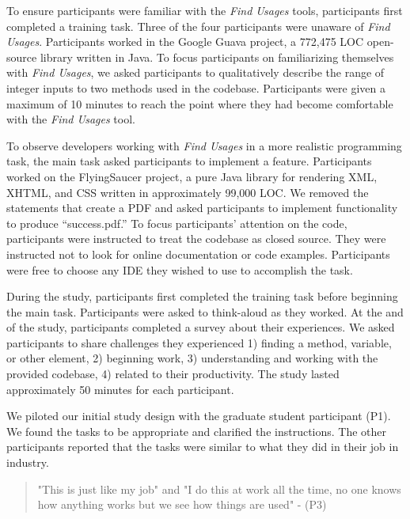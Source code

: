 \documentclass[conference]{IEEEtran}
\begin{document}

To ensure participants were familiar with the \textit{Find Usages} tools, participants first completed a training task. Three of the four participants were unaware of \textit{Find Usages}. %
Participants worked in the Google Guava project, a 772,475 LOC open-source library written in Java. To focus participants on familiarizing themselves with \textit{Find Usages}, we asked participants to qualitatively describe the range of integer inputs to two methods used in the codebase. Participants were given a maximum of 10 minutes to reach the point where they had become comfortable with the \textit{Find Usages} tool. \par

To observe developers working with \textit{Find Usages} in a more realistic programming task, the main task asked participants to implement a feature. Participants worked on the FlyingSaucer project, a pure Java library for rendering XML, XHTML, and CSS written in approximately 99,000 LOC. We removed the statements that create a PDF and asked participants to implement functionality to produce “success.pdf.” To focus participants' attention on the code, participants were instructed to treat the codebase as closed source. They were instructed not to look for online documentation or code examples. Participants were free to choose any IDE they wished to use to accomplish the task. 


During the study, participants first completed the training task before beginning the main task. 
Participants were asked to think-aloud as they worked.
At the and of the study, participants completed a survey about their experiences. We asked participants to share challenges they experienced 1) finding a method, variable, or other element, 2) beginning work, 3) understanding and working with the provided codebase, 4) related to their productivity. The study lasted approximately 50 minutes for each participant. 

We piloted our initial study design with the graduate student participant (P1). We found the tasks to be appropriate and clarified the instructions. The other participants reported that the tasks were similar to what they did in their job in industry. 
\begin{quote} "This is just like my job" and "I do this at work all the time, no one knows how anything works but we see how things are used"
- (P3)
\end{quote}
\end{document}
